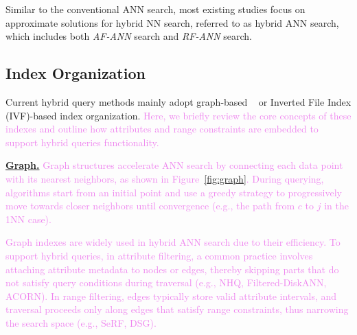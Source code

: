 \documentclass[sigconf, nonacm]{acmart}
\begin{document}
{	
	
	Similar to the conventional ANN search, most existing studies focus on approximate solutions for hybrid NN search, referred to as hybrid ANN search, which includes both \textit{AF-ANN} search and \textit{RF-ANN} search.
	
	
	
	\subsection{Index Organization}
	
	Current hybrid query methods mainly adopt graph-based ~\cite{nsw,kgraph,nsg,fanng,ngt} or Inverted File Index (IVF)-based \cite{PQ} index organization. 
	\textcolor{violet}{Here, we briefly review the core concepts of these indexes and outline how attributes and range constraints are embedded to support hybrid queries functionality.}
	
	\noindent\textbf{\underline{Graph.}}
	\textcolor{violet}{Graph structures accelerate ANN search by connecting each data point with its nearest neighbors, as shown in Figure~\ref{fig:graph}. During querying, algorithms start from an initial point and use a greedy strategy to progressively move towards closer neighbors until convergence (e.g., the path from $c$ to $j$ in the 1NN case).}
	
	\textcolor{violet}{Graph indexes are widely used in hybrid ANN search due to their efficiency. To support hybrid queries, in attribute filtering, a common practice involves attaching attribute metadata to nodes or edges, thereby skipping parts that do not satisfy query conditions during traversal (e.g., NHQ, Filtered-DiskANN, ACORN). In range filtering, edges typically store valid attribute intervals, and traversal proceeds only along edges that satisfy range constraints, thus narrowing the search space (e.g., SeRF, DSG).}
	
}
\end{document}
